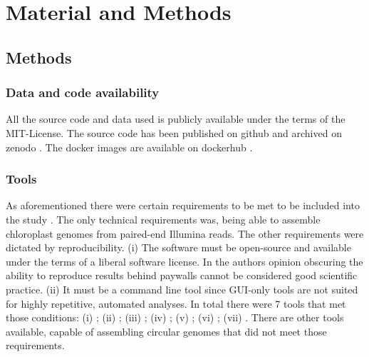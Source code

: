 \section{Material and Methods}
\subsection{Methods}
\subsubsection{Data and code availability}
All the source code and data used is publicly available under the terms of the MIT-License. The source code
has been published on github \cite{github-benchmark-repo} and archived on zenodo \cite{zenodorepo} . The
docker images are available on dockerhub \cite{dockerhub-benchmark}.

\subsubsection{Tools}
As aforementioned there were certain requirements to be met to be included into the study . The only technical
requirements was, being able to assemble chloroplast genomes from paired-end Illumina reads. The other
requirements were dictated by reproducibility. (i) The software must be open-source and available under the
terms of a liberal software license. In the authors opinion obscuring the ability to reproduce results behind
paywalls cannot be considered good scientific practice. (ii) It must be a command line tool since GUI-only
tools are not suited for highly repetitive, automated analyses.  In total there were 7 tools that met those
conditions: (i) \hspace{0.5ex} \ce \hspace{0.5ex} \cite{j_ankenbrand_chloroextractor:_2018}; (ii)
\hspace{0.5ex} \cassp \hspace{0.5ex} \cite{sancho_comparative_2018}; (iii)\hspace{0.5ex} \go \hspace{0.5ex}
\cite{jin_getorganelle:_2018}; (iv) \hspace{0.5ex} \oa \hspace{0.5ex} \cite{coissac_barcodes_2016}; (v)
\hspace{0.5ex} \ioga \hspace{0.5ex} \cite{bakker_herbarium_2016}; (vi) \hspace{0.5ex} \fp \hspace{0.5ex}
\cite{mckain__fast-plast_2017}; (vii) \hspace{0.5ex} \np \hspace{0.5ex} \cite{dierckxsens_novoplasty:_2017}.
There are other tools available, capable of assembling circular genomes that did not meet those requirements.

